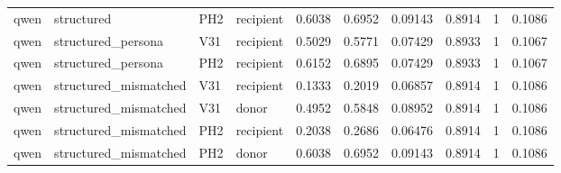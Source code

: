 \begin{tabular}{llllllllll}
qwen & structured & PH2 & recipient & 0.6038 & 0.6952 & 0.09143 & 0.8914 & 1 & 0.1086 \\
qwen & structured\_persona & V31 & recipient & 0.5029 & 0.5771 & 0.07429 & 0.8933 & 1 & 0.1067 \\
qwen & structured\_persona & PH2 & recipient & 0.6152 & 0.6895 & 0.07429 & 0.8933 & 1 & 0.1067 \\
qwen & structured\_mismatched & V31 & recipient & 0.1333 & 0.2019 & 0.06857 & 0.8914 & 1 & 0.1086 \\
qwen & structured\_mismatched & V31 & donor & 0.4952 & 0.5848 & 0.08952 & 0.8914 & 1 & 0.1086 \\
qwen & structured\_mismatched & PH2 & recipient & 0.2038 & 0.2686 & 0.06476 & 0.8914 & 1 & 0.1086 \\
qwen & structured\_mismatched & PH2 & donor & 0.6038 & 0.6952 & 0.09143 & 0.8914 & 1 & 0.1086 \\
\bottomrule
\end{tabular}
